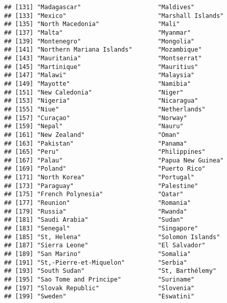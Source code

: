 \documentclass[
]{article}
\begin{document}
\begin{verbatim}
## [131] "Madagascar"                     "Maldives"                      
## [133] "Mexico"                         "Marshall Islands"              
## [135] "North Macedonia"                "Mali"                          
## [137] "Malta"                          "Myanmar"                       
## [139] "Montenegro"                     "Mongolia"                      
## [141] "Northern Mariana Islands"       "Mozambique"                    
## [143] "Mauritania"                     "Montserrat"                    
## [145] "Martinique"                     "Mauritius"                     
## [147] "Malawi"                         "Malaysia"                      
## [149] "Mayotte"                        "Namibia"                       
## [151] "New Caledonia"                  "Niger"                         
## [153] "Nigeria"                        "Nicaragua"                     
## [155] "Niue"                           "Netherlands"                   
## [157] "Curaçao"                        "Norway"                        
## [159] "Nepal"                          "Nauru"                         
## [161] "New Zealand"                    "Oman"                          
## [163] "Pakistan"                       "Panama"                        
## [165] "Peru"                           "Philippines"                   
## [167] "Palau"                          "Papua New Guinea"              
## [169] "Poland"                         "Puerto Rico"                   
## [171] "North Korea"                    "Portugal"                      
## [173] "Paraguay"                       "Palestine"                     
## [175] "French Polynesia"               "Qatar"                         
## [177] "Reunion"                        "Romania"                       
## [179] "Russia"                         "Rwanda"                        
## [181] "Saudi Arabia"                   "Sudan"                         
## [183] "Senegal"                        "Singapore"                     
## [185] "St, Helena"                     "Solomon Islands"               
## [187] "Sierra Leone"                   "El Salvador"                   
## [189] "San Marino"                     "Somalia"                       
## [191] "St,-Pierre-et-Miquelon"         "Serbia"                        
## [193] "South Sudan"                    "St, Barthélemy"                
## [195] "Sao Tome and Principe"          "Suriname"                      
## [197] "Slovak Republic"                "Slovenia"                      
## [199] "Sweden"                         "Eswatini"                      

\end{verbatim}
\end{document}
